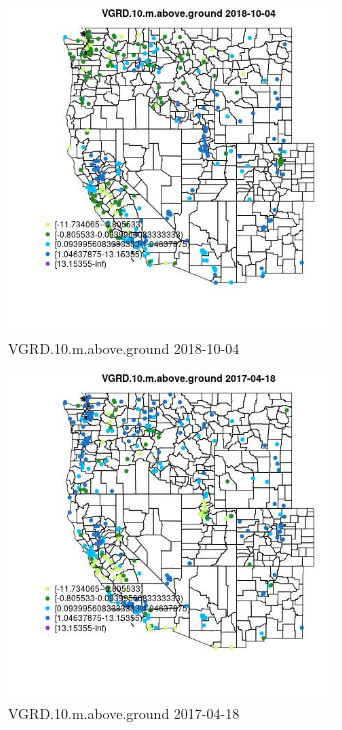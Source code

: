 \begin{figure} 
\centering  
\includegraphics[width=0.77\textwidth]{Code_Outputs/Report_ML_input_PM25_Step4_part_f_de_duplicated_aves_prioritize_24hr_obswNAs_MapObsVGRD10maboveground2018-10-04.jpg} 
\caption{\label{fig:Report_ML_input_PM25_Step4_part_f_de_duplicated_aves_prioritize_24hr_obswNAsMapObsVGRD10maboveground2018-10-04}VGRD.10.m.above.ground 2018-10-04} 
\end{figure} 
 

\begin{figure} 
\centering  
\includegraphics[width=0.77\textwidth]{Code_Outputs/Report_ML_input_PM25_Step4_part_f_de_duplicated_aves_prioritize_24hr_obswNAs_MapObsVGRD10maboveground2017-04-18.jpg} 
\caption{\label{fig:Report_ML_input_PM25_Step4_part_f_de_duplicated_aves_prioritize_24hr_obswNAsMapObsVGRD10maboveground2017-04-18}VGRD.10.m.above.ground 2017-04-18} 
\end{figure} 
 

